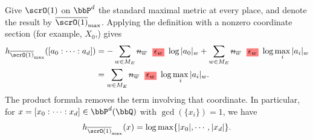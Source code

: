 \begin{example}[label=\labelNFM{eg:standard-logarithmic-height}, status=draft, tag=0000000]
	Give $\scrO(1)$ on $\bbP^d$ the standard maximal metric at every place, and denote the result by $\overline{\scrO(1)}_{\max}$.
	Applying the definition with a nonzero coordinate section (for example, $X_0$,) gives
	\begin{align*}
		h_{\overline{\scrO(1)}_{\max}}([a_0:\cdots:a_d]) & = -\sum_{w \in M_E}\latexdeletedmath{n_w}\latexaddedmath{\epsilon_w}\log |a_0|_w + \sum_{w \in M_E}\latexdeletedmath{n_w}\latexaddedmath{\epsilon_w}\log\max_i|a_i|_w \\
		                                                 & = \sum_{w \in M_E}\latexdeletedmath{n_w}\latexaddedmath{\epsilon_w}\log\max_i|a_i|_w.
	\end{align*}
	The product formula removes the term involving that coordinate.
	In particular, for $x = [x_0:\cdots:x_d] \in \bbP^d(\bbQ)$ with $\gcd(\{x_i\}) = 1$, we have
	\[  h_{\overline{\scrO(1)}_{\max}}(x) = \log \max\{|x_0|,\cdots,|x_d|\}. \]
\end{example}


